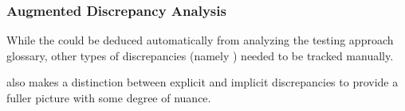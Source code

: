 
\subsubsection{Augmented Discrepancy Analysis}
\label{aug-discrep-analysis}
While the \autoDiscreps{} could be deduced automatically from analyzing the
testing approach glossary, other types of discrepancies (namely
) needed to be tracked manually.

 also makes a distinction between explicit and implicit%
discrepancies to provide a fuller picture with some degree of nuance.